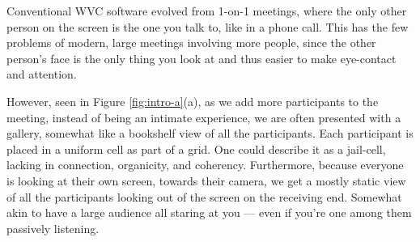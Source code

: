 \documentclass[11pt,letterpaper]{article}
\begin{document}
Conventional WVC software evolved from 1-on-1 meetings, where the only other person on the screen is the one you talk to, like in a phone call. This has the few problems of modern, large meetings involving more people, since the other person’s face is the only thing you look at and thus easier to make eye-contact and attention. 

However, seen in Figure \ref{fig:intro-a}(a), as we add more participants to the meeting, instead of being an intimate experience, we are often presented with a gallery, somewhat like a bookshelf view of all the participants. Each participant is placed in a uniform cell as part of a grid. One could describe it as a jail-cell, lacking in connection, organicity, and coherency. Furthermore, because everyone is looking at their own screen, towards their camera, we get a mostly static view of all the participants looking out of the screen on the receiving end. Somewhat akin to have a large audience all staring at you --- even if you’re one among them passively listening.







% 





\end{document}
